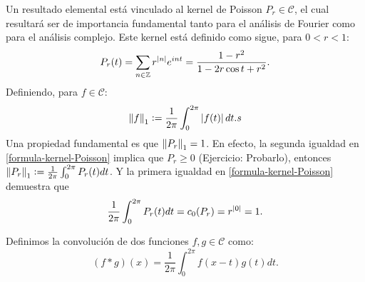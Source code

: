 Un resultado elemental está vinculado al kernel de Poisson \(P_r \in \mathcal{C}\), el cual resultará ser de importancia fundamental tanto para 
el análisis de Fourier como para el análisis complejo. Este kernel está definido como sigue, para \(0 < r < 1\):
\begin{equation}\label{formula-kernel-Poisson}
\displaystyle P_r(t)= \sum_{n\in \mathbb{Z}} r^{\left\lvert n\right\rvert}e^{int} = \frac{1-r^2}{1-2r\cos t + r^2}.
\end{equation}
Definiendo, para \(f\in \mathcal{C}\):
\[
\left\lVert f\right\rVert_1 \vcentcolon = \frac{1}{2\pi}\int_{0}^{2\pi} \left\lvert f(t)\right\rvert dt.s
\]
Una propiedad fundamental es que \(\left\lVert P_r\right\rVert_1 = 1\). En efecto, la segunda igualdad en \ref{formula-kernel-Poisson} implica que \(P_r\geq 0\) 
(Ejercicio: Probarlo), entonces \(\left\lVert P_r\right\rVert_1 \vcentcolon = \frac{1}{2\pi}\int_{0}^{2\pi} P_r(t) dt \). Y la primera igualdad en \ref{formula-kernel-Poisson}
demuestra que 
\[
\frac{1}{2\pi}\int_{0}^{2\pi} P_r(t) dt = c_0(P_r)= r^{\left\lvert0\right\rvert} = 1.
\]

\begin{defi}[Convolución]
Definimos la convolución de dos funciones \(f, g\in \mathcal{C}\) como:
\[
(f * g) (x) = \frac{1}{2\pi}\int_{0}^{2\pi} f(x-t)g(t) dt.
\]
\end{defi}